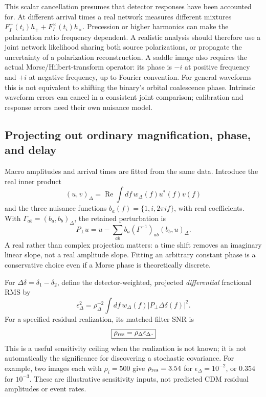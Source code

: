 This scalar cancellation presumes that detector responses have been accounted
for. At different arrival times a real network measures different mixtures
\(F^+_I(t_i)h_++F^\times_I(t_i)h_\times\). Precession or higher harmonics can
make the polarization ratio frequency dependent. A realistic analysis should
therefore use a joint network likelihood sharing both source polarizations, or
propagate the uncertainty of a polarization reconstruction. A saddle image also
requires the actual Morse/Hilbert-transform operator: its phase is \(-i\) at
positive frequency and \(+i\) at negative frequency, up to Fourier convention.
For general waveforms this is not equivalent to shifting the binary's orbital
coalescence phase. Intrinsic waveform errors can cancel in a consistent joint
comparison; calibration and response errors need their own nuisance model.

\subsection{Projecting out ordinary magnification, phase, and delay}

Macro amplitudes and arrival times are fitted from the same data. Introduce the
real inner product
\begin{equation}
 (u,v)_\Delta=\operatorname{Re}\int df\,w_\Delta(f)u^*(f)v(f)
\end{equation}
and the three nuisance functions \(b_a(f)=\{1,i,2\pi if\}\), with real
coefficients. With \(\Gamma_{ab}=(b_a,b_b)_\Delta\), the retained perturbation is
\begin{equation}
 P_\perp u=u-\sum_{ab}b_a(\Gamma^{-1})_{ab}(b_b,u)_\Delta.
 \label{eq:infer_projection}
\end{equation}
A real rather than complex projection matters: a time shift removes an imaginary
linear slope, not a real amplitude slope. Fitting an arbitrary constant phase is
a conservative choice even if a Morse phase is theoretically discrete.

For \(\Delta\delta=\delta_1-\delta_2\), define the detector-weighted,
projected \emph{differential} fractional RMS by
\begin{equation}
 \epsilon_\Delta^2=\rho_\Delta^{-2}
 \int df\,w_\Delta(f)|P_\perp\Delta\delta(f)|^2.
\end{equation}
For a specified residual realization, its matched-filter SNR is
\begin{equation}
 \boxed{\rho_{\rm res}=\rho_\Delta\epsilon_\Delta.}
 \label{eq:infer_known}
\end{equation}
This is a useful sensitivity ceiling when the realization is not known; it is
not automatically the significance for discovering a stochastic covariance.
For example, two images each with \(\rho_i=500\) give
\(\rho_{\rm res}=3.54\) for \(\epsilon_\Delta=10^{-2}\), or \(0.354\) for
\(10^{-3}\). These are illustrative sensitivity inputs, not predicted CDM
residual amplitudes or event rates.

